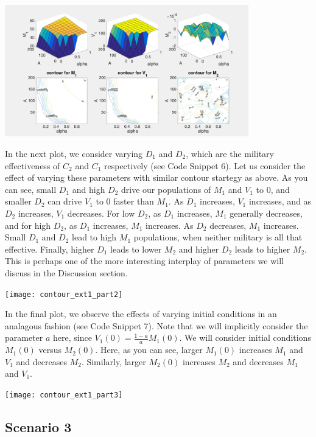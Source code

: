 \documentclass[12pt]{article}
\begin{document}
\begin{center}
\includegraphics[width=300pt]{contour_ext1_part1}
\end{center}

In the next plot, we consider varying $D_1$ and $D_2$, which are the military effectiveness of $C_2$ and $C_1$ respectively (see Code Snippet 6). Let us consider the effect of varying these parameters with similar contour startegy as above. As you can see, small $D_1$ and high $D_2$ drive our populations of $M_1$ and $V_1$ to 0, and smaller $D_2$ can drive $V_1$ to 0 faster than $M_1$. As $D_1$ increases, $V_1$ increases, and as $D_2$ increases, $V_1$ decreases. For low $D_2$, as $D_1$ increases, $M_1$ generally decreases, and for high $D_2$, as $D_1$ increases, $M_1$ increases. As $D_2$ decreases, $M_1$ increases. Small $D_1$ and $D_2$ lead to high $M_1$ populations, when neither military is all that effective. Finally, higher $D_1$ leads to lower $M_2$ and higher $D_2$ leads to higher $M_2$. This is perhaps one of the more interesting interplay of parameters we will discuss in the Discussion section.

\begin{center}
\texttt{[image: contour\_ext1\_part2]}
\end{center}

In the final plot, we observe the effects of varying initial conditions in an analagous fashion (see Code Snippet 7). Note that we will implicitly consider the parameter $a$ here, since $V_1(0) = \frac{1 - a}{a} M_1(0)$. We will consider initial conditions $M_1(0)$ versus $M_2(0)$. Here, as you can see, larger $M_1(0)$ increases $M_1$ and $V_1$ and decreases $M_2$. Similarly, larger $M_2(0)$ increases $M_2$ and decreases $M_1$ and $V_1$.

\begin{center}
\texttt{[image: contour\_ext1\_part3]}
\end{center}


\subsection{Scenario 3}
\end{document}
